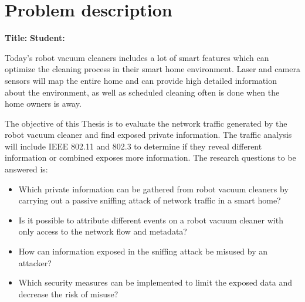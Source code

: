 \chapter*{Problem description}


\textbf{Title:}
\newline
\textbf{Student:}
\newline
\newline

Today's robot vacuum cleaners includes a lot of smart features which can optimize the cleaning process in their smart home environment. Laser and camera sensors will map the entire home and can provide high detailed information about the environment, as well as scheduled cleaning often is done when the home owners is away.

The objective of this Thesis is to evaluate the network traffic generated by the robot vacuum cleaner and find exposed private information. The traffic analysis will include IEEE 802.11 and 802.3 to determine if they reveal different information or combined exposes more information. The research questions to be answered is: 
\begin{itemize}
    \item Which private information can be gathered from robot vacuum cleaners by carrying out a passive sniffing attack of network traffic in a smart home?
    \item Is it possible to attribute different events on a robot vacuum cleaner with only access to the network flow and metadata?
    \item How can information exposed in the sniffing attack be misused by an attacker?
    \item Which security measures can be implemented to limit the exposed data and decrease the risk of misuse? 
\end{itemize}



